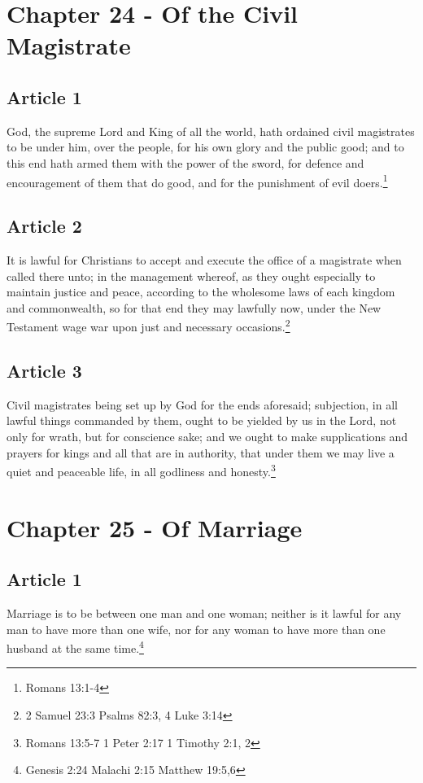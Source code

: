\documentclass[12pt,letterpaper]{book}
\begin{document}
\chapter{Chapter 24 - Of the Civil Magistrate}
\section{Article 1}

God, the supreme Lord and King of all the world, hath ordained civil magistrates to be under him, over the people, for his own glory and the public good; and to this end hath armed them with the power of the sword, for defence and encouragement of them that do good, and for the punishment of evil doers.\footnote{Romans 13:1-4}

\section{Article 2}

It is lawful for Christians to accept and execute the office of a magistrate when called there unto; in the management whereof, as they ought especially to maintain justice and peace, according to the wholesome laws of each kingdom and commonwealth, so for that end they may lawfully now, under the New Testament wage war upon just and necessary occasions.\footnote{2 Samuel 23:3 Psalms 82:3, 4 Luke 3:14}

\section{Article 3}

Civil magistrates being set up by God for the ends aforesaid; subjection, in all lawful things commanded by them, ought to be yielded by us in the Lord, not only for wrath, but for conscience sake; and we ought to make supplications and prayers for kings and all that are in authority, that under them we may live a quiet and peaceable life, in all godliness and honesty.\footnote{Romans 13:5-7 1 Peter 2:17 1 Timothy 2:1, 2}

\chapter{Chapter 25 - Of Marriage}
\section{Article 1}

Marriage is to be between one man and one woman; neither is it lawful for any man to have more than one wife, nor for any woman to have more than one husband at the same time.\footnote{Genesis 2:24 Malachi 2:15 Matthew 19:5,6}
\end{document}
